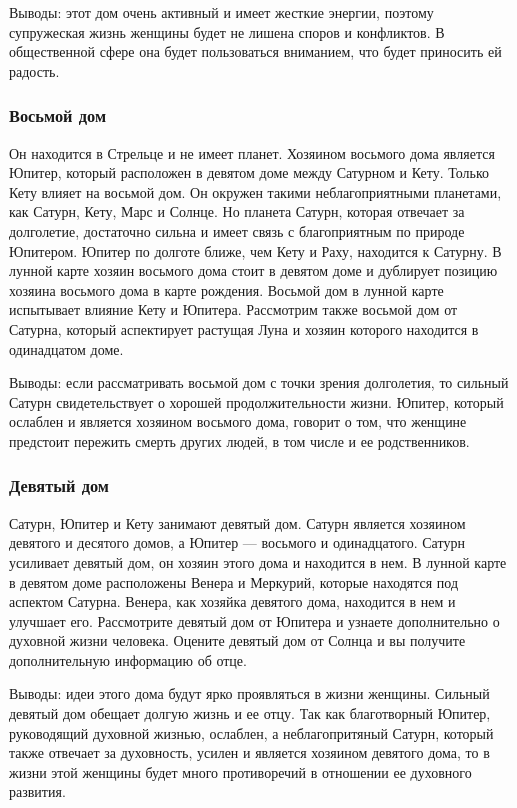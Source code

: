 Выводы: этот дом очень активный и имеет жесткие энергии, поэтому супружеская жизнь женщины будет не лишена споров и конфликтов. В общественной сфере она будет пользоваться вниманием, что будет приносить ей радость.


\subsubsection*{Восьмой дом}
Он находится в Стрельце и не имеет планет. Хозяином восьмого дома является Юпитер, который расположен в девятом доме между Сатурном и Кету. Только Кету влияет на восьмой дом. Он окружен такими неблагоприятными планетами, как Сатурн, Кету, Марс и Солнце. Но планета Сатурн, которая отвечает за долголетие, достаточно сильна и имеет связь с благоприятным по природе Юпитером. Юпитер по долготе ближе, чем Кету и Раху, находится к Сатурну. В лунной карте хозяин восьмого дома стоит в девятом доме и дублирует позицию хозяина восьмого дома в карте рождения. Восьмой дом в лунной карте испытывает влияние Кету и Юпитера. Рассмотрим также восьмой дом от Сатурна, который аспектирует растущая Луна и хозяин которого находится в одинадцатом доме.

Выводы: если рассматривать восьмой дом с точки зрения долголетия, то сильный Сатурн свидетельствует о хорошей продолжительности жизни. Юпитер, который ослаблен и является хозяином восьмого дома, говорит о том, что женщине предстоит пережить смерть других людей, в том числе и ее родственников.

\subsubsection*{Девятый дом}
Сатурн, Юпитер и Кету занимают девятый дом. Сатурн является хозяином девятого и десятого домов, а Юпитер --- восьмого и одинадцатого. Сатурн усиливает девятый дом, он хозяин этого дома и находится в нем. В лунной карте в девятом доме расположены Венера и Меркурий, которые находятся под аспектом Сатурна. Венера, как хозяйка девятого дома, находится в нем и улучшает его. Рассмотрите девятый дом от Юпитера и узнаете дополнительно о духовной жизни человека. Оцените девятый дом от Солнца и вы получите дополнительную информацию об отце.

Выводы: идеи этого дома будут ярко проявляться в жизни женщины. Сильный девятый дом обещает долгую жизнь и ее отцу. Так как благотворный Юпитер, руководящий духовной жизнью, ослаблен, а неблагопритяный Сатурн, который также отвечает за духовность, усилен и является хозяином девятого дома, то в жизни этой женщины будет много противоречий в отношении ее духовного развития.

